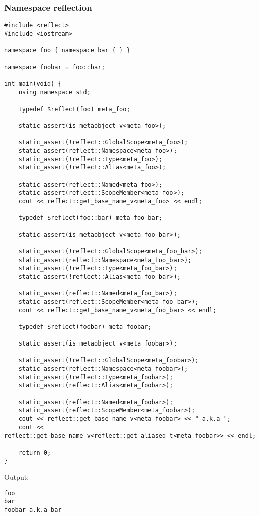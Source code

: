 \subsubsection{Namespace reflection}

\begin{verbatim}
#include <reflect>
#include <iostream>

namespace foo { namespace bar { } }

namespace foobar = foo::bar;

int main(void) {
	using namespace std;

	typedef $reflect(foo) meta_foo;

	static_assert(is_metaobject_v<meta_foo>);

	static_assert(!reflect::GlobalScope<meta_foo>);
	static_assert(reflect::Namespace<meta_foo>);
	static_assert(!reflect::Type<meta_foo>);
	static_assert(!reflect::Alias<meta_foo>);

	static_assert(reflect::Named<meta_foo>);
	static_assert(reflect::ScopeMember<meta_foo>);
	cout << reflect::get_base_name_v<meta_foo> << endl;

	typedef $reflect(foo::bar) meta_foo_bar;

	static_assert(is_metaobject_v<meta_foo_bar>);

	static_assert(!reflect::GlobalScope<meta_foo_bar>);
	static_assert(reflect::Namespace<meta_foo_bar>);
	static_assert(!reflect::Type<meta_foo_bar>);
	static_assert(!reflect::Alias<meta_foo_bar>);

	static_assert(reflect::Named<meta_foo_bar>);
	static_assert(reflect::ScopeMember<meta_foo_bar>);
	cout << reflect::get_base_name_v<meta_foo_bar> << endl;

	typedef $reflect(foobar) meta_foobar;

	static_assert(is_metaobject_v<meta_foobar>);

	static_assert(!reflect::GlobalScope<meta_foobar>);
	static_assert(reflect::Namespace<meta_foobar>);
	static_assert(!reflect::Type<meta_foobar>);
	static_assert(reflect::Alias<meta_foobar>);

	static_assert(reflect::Named<meta_foobar>);
	static_assert(reflect::ScopeMember<meta_foobar>);
	cout << reflect::get_base_name_v<meta_foobar> << " a.k.a ";
	cout << reflect::get_base_name_v<reflect::get_aliased_t<meta_foobar>> << endl;

	return 0;
}
\end{verbatim}

Output:

\begin{verbatim}
foo
bar
foobar a.k.a bar
\end{verbatim}

